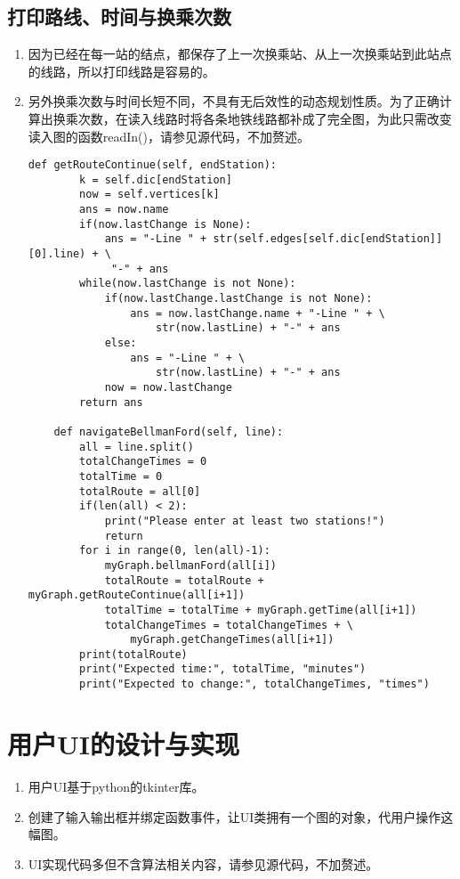 \documentclass[12pt,letterpaper]{article}
\begin{document}
\subsection{打印路线、时间与换乘次数}
\begin{enumerate}
	\item 因为已经在每一站的结点，都保存了上一次换乘站、从上一次换乘站到此站点的线路，所以打印线路是容易的。
	\item 另外换乘次数与时间长短不同，不具有无后效性的动态规划性质。为了正确计算出换乘次数，在读入线路时将各条地铁线路都补成了完全图，为此只需改变读入图的函数readIn()，请参见源代码，不加赘述。
\begin{lstlisting}[style = Python]
    def getRouteContinue(self, endStation):
        k = self.dic[endStation]
        now = self.vertices[k]
        ans = now.name
        if(now.lastChange is None):
            ans = "-Line " + str(self.edges[self.dic[endStation]][0].line) + \
             "-" + ans
        while(now.lastChange is not None):
            if(now.lastChange.lastChange is not None):
                ans = now.lastChange.name + "-Line " + \
                    str(now.lastLine) + "-" + ans
            else:
                ans = "-Line " + \
                    str(now.lastLine) + "-" + ans
            now = now.lastChange
        return ans

    def navigateBellmanFord(self, line):
        all = line.split()
        totalChangeTimes = 0
        totalTime = 0
        totalRoute = all[0]
        if(len(all) < 2):
            print("Please enter at least two stations!")
            return
        for i in range(0, len(all)-1):
            myGraph.bellmanFord(all[i])
            totalRoute = totalRoute + myGraph.getRouteContinue(all[i+1])
            totalTime = totalTime + myGraph.getTime(all[i+1])
            totalChangeTimes = totalChangeTimes + \
                myGraph.getChangeTimes(all[i+1])
        print(totalRoute)
        print("Expected time:", totalTime, "minutes")
        print("Expected to change:", totalChangeTimes, "times")
\end{lstlisting}	
\end{enumerate}


\section{用户UI的设计与实现}
\begin{enumerate}
	\item 用户UI基于python的tkinter库。
	\item 创建了输入输出框并绑定函数事件，让UI类拥有一个图的对象，代用户操作这幅图。
	\item UI实现代码多但不含算法相关内容，请参见源代码，不加赘述。
\end{enumerate}	
\end{document}
